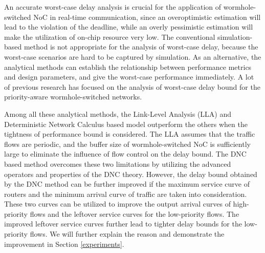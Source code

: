\documentclass[10pt,journal]{IEEEtran}
\begin{document}
An accurate worst-case delay analysis is crucial for the application of wormhole-switched NoC in real-time communication, since an overoptimistic estimation will lead to the violation of the deadline, while an overly pessimistic estimation will make the utilization of on-chip resource very low. The conventional simulation-based method is not appropriate for the analysis of worst-case delay, because the worst-case scenarios are hard to be captured by simulation. As an alternative, the analytical methods can establish the relationship between performance metrics and design parameters, and give the worst-case performance immediately. A lot of previous research \cite{Shi:2008:RCA:1397757.1397996,73,Qian489900,LuJS05,707545,708526,LuJS05} has focused on the analysis of worst-case delay bound for the priority-aware wormhole-switched networks.

Among all these analytical methods, the Link-Level Analysis (LLA) \cite{73} and Deterministic Network Calculus \cite{Qian489900} based model outperform the others when the tightness of performance bound is considered. The LLA assumes that the traffic flows are periodic, and the buffer size of wormhole-switched NoC is sufficiently large to eliminate the influence of flow control on the delay bound. The DNC based method \cite{Qian489900} overcomes these two limitations by utilizing the advanced operators and properties of the DNC theory. However, the delay bound obtained by the DNC method \cite{Qian489900} can be further improved if the maximum service curve of routers and the minimum arrival curve of traffic are taken into consideration. These two curves can be utilized to improve the output arrival curves of high-priority flows and the leftover service curves for the low-priority flows. The improved leftover service curves further lead to tighter delay bounds for the low-priority flows. We will further explain the reason and demonstrate the improvement in Section \ref{experiments}.
\end{document}

